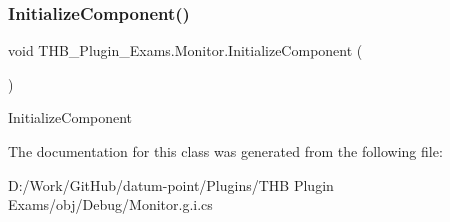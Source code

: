 \subsubsection{\texorpdfstring{Initialize\+Component()}{InitializeComponent()}\hspace{0.1cm}{\footnotesize\ttfamily [2/2]}}
{\footnotesize\ttfamily void T\+H\+B\+\_\+\+Plugin\+\_\+\+Exams.\+Monitor.\+Initialize\+Component (\begin{DoxyParamCaption}{ }\end{DoxyParamCaption})}



Initialize\+Component 



The documentation for this class was generated from the following file\+:\begin{DoxyCompactItemize}
\item 
D\+:/\+Work/\+Git\+Hub/datum-\/point/\+Plugins/\+T\+H\+B Plugin Exams/obj/\+Debug/Monitor.\+g.\+i.\+cs\end{DoxyCompactItemize}
